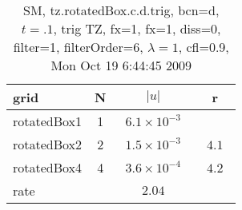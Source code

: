 \begin{table}[hbt]\tableFont %
\begin{center}
\begin{tabular}{|l|c|c|c|} \hline 
grid  & N &  $\vert u \vert$   & r \\ \hline 
         rotatedBox1 &     1 & ~$6.1\times10^{ -3}$~ &            \\ \hline
         rotatedBox2 &     2 & ~$1.5\times10^{ -3}$~ & ~$  4.1$~  \\ \hline
         rotatedBox4 &     4 & ~$3.6\times10^{ -4}$~ & ~$  4.2$~  \\ \hline
    rate             &       &       $2.04$         &        \\ \hline
\end{tabular}
\caption{SM, tz.rotatedBox.c.d.trig, bcn=d, $t=.1$, trig TZ, fx=1, fx=1, diss=0, filter=1, filterOrder=6, $\lambda=1$, cfl=0.9,  Mon Oct 19  6:44:45 2009}\label{table:tz.rotatedBox.c.d.trig}
\end{center}
\end{table}
